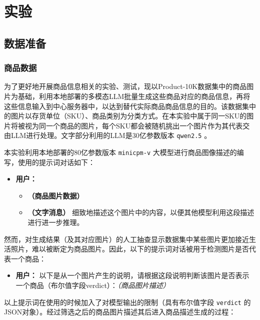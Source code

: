 \newpage
\section{实验}
\label{sec:experiment}

\subsection{数据准备}

\subsubsection{商品数据}

为了更好地开展商品信息相关的实验、测试，现以Product-10K数据集\cite{bai2020products10k}中的商品图片为基础，利用本地部署的多模态LLM批量生成这些商品对应的商品信息，再将这些信息输入到中心服务器中，以达到替代实际商品商品信息的目的。该数据集中的图片以存货单位（SKU）、商品类别为分类方式。在本实验中属于同一SKU的图片将被视为同一个商品的图片，每个SKU都会被随机挑出一个图片作为其代表交由LLM进行处理。文字部分利用的LLM是30亿参数版本 \verb|qwen2.5| 。

本实验利用本地部署的80亿参数版本 \verb|minicpm-v| 大模型进行商品图像描述的编写，使用的提示词对话如下：

\begin{itemize}
    \item[] \textbf{用户：}
    \begin{itemize}
        \item[] \textbf{（商品图片数据）}
        \item[] \textbf{（文字消息）} 细致地描述这个图片中的内容，以便其他模型利用这段描述进行进一步推理。
    \end{itemize}
\end{itemize}

然而，对生成结果（及其对应图片）的人工抽查显示数据集中某些图片更加接近生活照片，难以被断定为商品图片。因此，以下的提示词对话被用于检测图片是否代表一个商品：

\begin{itemize}
    \item[] \textbf{用户：} 以下是从一个图片产生的说明，请根据这段说明判断该图片是否表示一个商品（布尔值字段verdict）：\textit{（商品图片描述）}
\end{itemize}

以上提示词在使用的时候加入了对模型输出的限制（具有布尔值字段 \verb|verdict| 的JSON对象）。经过筛选之后的商品图片描述其后进入商品描述生成的过程：

